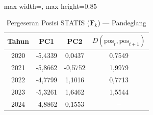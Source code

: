 \begin{table}[H]
\centering
\caption{Pergeseran Posisi STATIS ($\mathbf{F}_k$) --- Pandeglang} \label{tab:app2jarak_statis_skor_pandeglang}
\begin{adjustbox}{max width=\textwidth, max height=0.85\textheight}
\begin{tabular}{|c|c|c|c|}
\hline
\textbf{Tahun} & \textbf{PC1} & \textbf{PC2} & \textbf{$D(\text{pos}_t, \text{pos}_{t+1})$} \\
\hline
2020 & -5,4339 & 0,0437 & 0,7549 \\
2021 & -5,8662 & -0,5752 & 1,9979 \\
2022 & -4,7799 & 1,1016 & 0,7713 \\
2023 & -5,3261 & 1,6462 & 1,5544 \\
2024 & -4,8862 & 0,1553 & -- \\
\hline
\end{tabular}
\end{adjustbox}
\end{table}